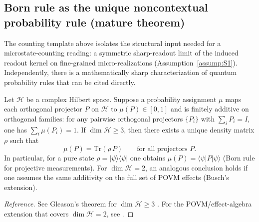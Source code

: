 \subsection{Born rule as the unique noncontextual probability rule (mature theorem)}
The counting template above isolates the structural input needed for a microstate-counting reading: a symmetric sharp-readout limit of the induced readout kernel on fine-grained micro-realizations (Assumption~\ref{assump:S1}). Independently, there is a mathematically sharp characterization of quantum probability rules that can be cited directly.

\begin{theorem}
\label{thm:gleason_busch}
Let $\mathcal{H}$ be a complex Hilbert space. Suppose a probability assignment $\mu$ maps each orthogonal projector $P$ on $\mathcal{H}$ to $\mu(P)\in[0,1]$ and is finitely additive on orthogonal families: for any pairwise orthogonal projectors $\{P_i\}$ with $\sum_i P_i = I$, one has $\sum_i \mu(P_i)=1$.
If $\dim\mathcal{H}\ge 3$, then there exists a unique density matrix $\rho$ such that
\begin{equation}
    \mu(P)=\mathrm{Tr}(\rho\,P)\qquad\text{for all projectors }P.
\end{equation}
In particular, for a pure state $\rho=|\psi\rangle\langle\psi|$ one obtains $\mu(P)=\langle\psi|P|\psi\rangle$ (Born rule for projective measurements).
For $\dim\mathcal{H}=2$, an analogous conclusion holds if one assumes the same additivity on the full set of POVM effects (Busch's extension).
\end{theorem}
\begin{proof}[Reference]
See Gleason's theorem for $\dim\mathcal{H}\ge 3$ \cite{Gleason1957}. For the POVM/effect-algebra extension that covers $\dim\mathcal{H}=2$, see \cite{Busch2003}.
\end{proof}


